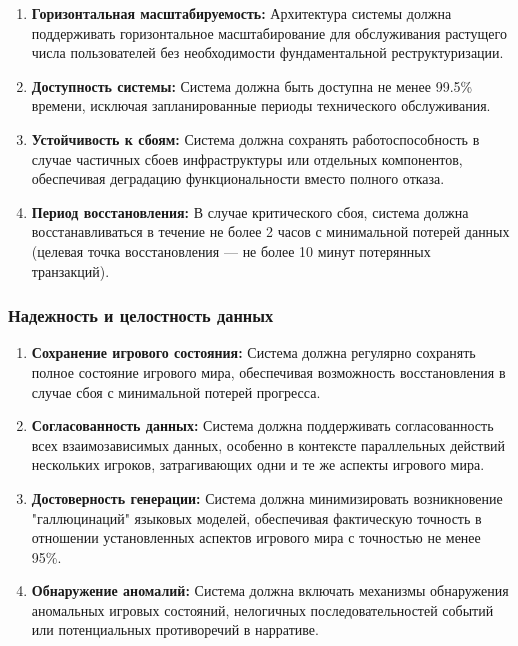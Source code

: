 \begin{enumerate}[label=NFR\arabic*., resume]
    \item \textbf{Горизонтальная масштабируемость:} Архитектура системы должна поддерживать горизонтальное масштабирование для обслуживания растущего числа пользователей без необходимости фундаментальной реструктуризации.

    \item \textbf{Доступность системы:} Система должна быть доступна не менее 99.5\% времени, исключая запланированные периоды технического обслуживания.

    \item \textbf{Устойчивость к сбоям:} Система должна сохранять работоспособность в случае частичных сбоев инфраструктуры или отдельных компонентов, обеспечивая деградацию функциональности вместо полного отказа.

    \item \textbf{Период восстановления:} В случае критического сбоя, система должна восстанавливаться в течение не более 2 часов с минимальной потерей данных (целевая точка восстановления — не более 10 минут потерянных транзакций).
\end{enumerate}

\subsubsection{Надежность и целостность данных}

\begin{enumerate}[label=NFR\arabic*., resume]
    \item \textbf{Сохранение игрового состояния:} Система должна регулярно сохранять полное состояние игрового мира, обеспечивая возможность восстановления в случае сбоя с минимальной потерей прогресса.

    \item \textbf{Согласованность данных:} Система должна поддерживать согласованность всех взаимозависимых данных, особенно в контексте параллельных действий нескольких игроков, затрагивающих одни и те же аспекты игрового мира.

    \item \textbf{Достоверность генерации:} Система должна минимизировать возникновение "{}галлюцинаций"{} языковых моделей, обеспечивая фактическую точность в отношении установленных аспектов игрового мира с точностью не менее 95\%.

    \item \textbf{Обнаружение аномалий:} Система должна включать механизмы обнаружения аномальных игровых состояний, нелогичных последовательностей событий или потенциальных противоречий в нарративе.
\end{enumerate}


